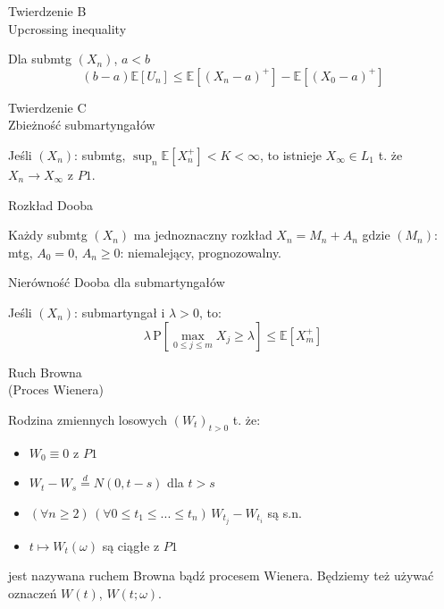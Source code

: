 \documentclass[avery5371,grid,frame]{flashcards}
\begin{document}
\begin{flashcard}[Twierdzenie]{Twierdzenie B \\ Upcrossing inequality}

\smallskip
Dla submtg $(X_n)$, $ a < b $
$$ (b-a) \mathbb{E}[U_n] \leq \mathbb{E}[(X_n-a)^+] - \mathbb{E}[(X_0 - a)^+]$$
\end{flashcard}

\begin{flashcard}[Twierdzenie]{Twierdzenie C \\ Zbieżność submartyngałów}

\smallskip
Jeśli $(X_n)$: submtg, $\sup _n \mathbb{E}[X ^+ _n] < K < \infty$, to istnieje $X_\infty \in L_1$ t. że $X_n \rightarrow X_\infty$ z $P1$.
\end{flashcard}

\begin{flashcard}[Twierdzenie]{Rozkład Dooba}

\smallskip
Każdy submtg $(X_n)$ ma jednoznaczny rozkład $X_n = M_n + A_n$ gdzie $(M_n)$: mtg, $A_0 = 0$, $A_n \geq 0$: niemalejący, prognozowalny.
\end{flashcard}

\begin{flashcard}[Twierdzenie]{Nierówność Dooba dla submartyngałów}

\smallskip
Jeśli $(X_n)$: submartyngał i $\lambda > 0$, to:
$$ \lambda \, \text{P} \left[ \max _{ 0 \leq j \leq m} X_j \geq \lambda \right] \leq \mathbb{E}[X ^+ _m] $$
\end{flashcard}


\begin{flashcard}[Definicja]{Ruch Browna \\ (Proces Wienera)}

Rodzina zmiennych losowych $ \left( W_t \right) _{t > 0} $ t. że:
\begin{itemize}
\item $W_0 \equiv 0$ z $P1$
\item $W_t - W_s \stackrel{d}{=} N(0, t-s)$ dla $ t > s $
\item $(\forall {n \geq 2}) \, (\forall { 0 \leq t_1 \leq ... \leq t_n }) \, W_{t_j} - W_{t_i}$ są s.n.
\item $t \mapsto W_t(\omega)$ są ciągłe z $P1$
\end{itemize}
jest nazywana ruchem Browna bądź procesem Wienera. Będziemy też używać oznaczeń $W(t)$, $W(t; \omega)$.
\end{flashcard}
\end{document}
